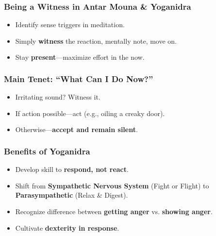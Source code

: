 \begin{frame}[fragile]\frametitle{Being a Witness in Antar Mouna \& Yoganidra}
      \begin{itemize}
      \item Identify sense triggers in meditation.
      \item Simply \textbf{witness} the reaction, mentally note, move on.
      \item Stay \textbf{present}—maximize effort in the now.
      \end{itemize}
\end{frame}

\begin{frame}[fragile]\frametitle{Main Tenet: “What Can I Do Now?”}
      \begin{itemize}
      \item Irritating sound? Witness it.
      \item If action possible—act (e.g., oiling a creaky door).
      \item Otherwise—\textbf{accept and remain silent}.
      \end{itemize}
\end{frame}

\begin{frame}[fragile]\frametitle{Benefits of Yoganidra}
      \begin{itemize}
      \item Develop skill to \textbf{respond, not react}.
      \item Shift from \textbf{Sympathetic Nervous System} (Fight or Flight) to \textbf{Parasympathetic} (Relax \& Digest).
      \item Recognize difference between \textbf{getting anger} vs. \textbf{showing anger}.
      \item Cultivate \textbf{dexterity in response}.
      \end{itemize}
\end{frame}



